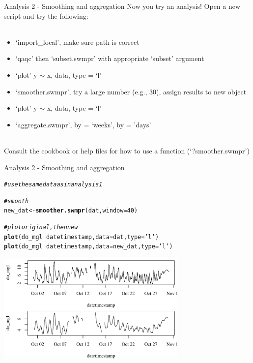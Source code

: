 \documentclass[xcolor=svgnames]{beamer}\usepackage[]{graphicx}\usepackage[]{color}
\makeatletter
\newcommand{\hlnum}[1]{\textcolor[rgb]{0.686,0.059,0.569}{#1}}%
\newcommand{\hlstr}[1]{\textcolor[rgb]{0.192,0.494,0.8}{#1}}%
\newcommand{\hlcom}[1]{\textcolor[rgb]{0.678,0.584,0.686}{\textit{#1}}}%
\newcommand{\hlopt}[1]{\textcolor[rgb]{0,0,0}{#1}}%
\newcommand{\hlstd}[1]{\textcolor[rgb]{0.345,0.345,0.345}{#1}}%
\newcommand{\hlkwb}[1]{\textcolor[rgb]{0.69,0.353,0.396}{#1}}%
\newcommand{\hlkwc}[1]{\textcolor[rgb]{0.333,0.667,0.333}{#1}}%
\newcommand{\hlkwd}[1]{\textcolor[rgb]{0.737,0.353,0.396}{\textbf{#1}}}%
\newenvironment{kframe}{%
 \def\at@end@of@kframe{}%
 \ifinner\ifhmode%
  \def\at@end@of@kframe{\end{minipage}}%
  \begin{minipage}{\columnwidth}%
 \fi\fi%
 \def\FrameCommand##1{\hskip\@totalleftmargin \hskip-\fboxsep
 \colorbox{shadecolor}{##1}\hskip-\fboxsep
     \hskip-\linewidth \hskip-\@totalleftmargin \hskip\columnwidth}%
 \MakeFramed {\advance\hsize-\width
   \@totalleftmargin\z@ \linewidth\hsize
   \@setminipage}}%
 {\par\unskip\endMakeFramed%
 \at@end@of@kframe}
\newenvironment{knitrout}{}{} %
\makeatother
\begin{document}
\begin{frame}[containsverbatim]{Analysis 2 - Smoothing and aggregation}
Now you try an analysis! Open a new script and try the following: \\~\\
\begin{itemize}
\item `import\_local', make sure path is correct
\item `qaqc' then `subset.swmpr' with appropriate `subset' argument
\item `plot' y $\sim$ x, data, type = `l'
\item `smoother.swmpr', try a large number (e.g., 30), assign results to new object 
\item `plot' y $\sim$ x, data, type = `l'
\item `aggregate.swmpr', by = `weeks', by = 'days'\\~\\
\end{itemize}
Consult the cookbook or help files for how to use a function (`?smoother.swmpr')
\end{frame}

\begin{frame}[containsverbatim]{Analysis 2 - Smoothing and aggregation}
\begin{knitrout}\scriptsize
{}\color{fgcolor}\begin{kframe}
\begin{alltt}
\hlcom{# use the same data as in analysis 1}

\hlcom{# smooth }
\hlstd{new_dat} \hlkwb{<-} \hlkwd{smoother.swmpr}\hlstd{(dat,} \hlkwc{window} \hlstd{=} \hlnum{40}\hlstd{)}

\hlcom{# plot original, then new}
\hlkwd{plot}\hlstd{(do_mgl} \hlopt{~} \hlstd{datetimestamp,} \hlkwc{data} \hlstd{= dat,} \hlkwc{type} \hlstd{=} \hlstr{'l'}\hlstd{)}
\hlkwd{plot}\hlstd{(do_mgl} \hlopt{~} \hlstd{datetimestamp,} \hlkwc{data} \hlstd{= new_dat,} \hlkwc{type} \hlstd{=} \hlstr{'l'}\hlstd{)}
\end{alltt}
\end{kframe}
\end{knitrout}
\begin{knitrout}\scriptsize
{}\color{fgcolor}

{\centering \includegraphics[width=0.7\textwidth]{figure/unnamed-chunk-20} 

}



\end{knitrout}
\end{frame}
\end{document}

